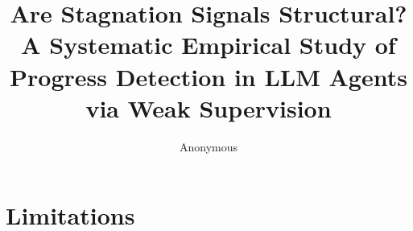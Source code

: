 \documentclass[11pt]{article}
\title{Are Stagnation Signals Structural? A Systematic Empirical Study of Progress Detection in LLM Agents via Weak Supervision}
\author{Anonymous}
\begin{document}
\maketitle









\section*{Limitations}




\appendix

\end{document}
